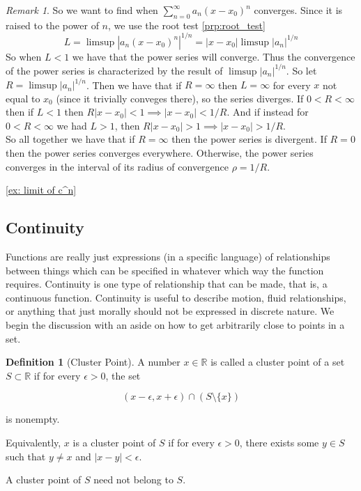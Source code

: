 \documentclass{article}
\theoremstyle{definition}
\newtheorem{definition}{Definition}[section]
\theoremstyle{remark}
\newtheorem{remark}{Remark}[section]
\begin{document}
\begin{remark}
So we want to find when $\sum_{n=0}^{\infty} a_n (x - x_0)^n$ converges. 
Since it is raised to the power of $n$, we use the root test \ref{prp:root_test}
\[
L = \limsup |a_n (x - x_0)^n|^{1/n} = |x-x_0|\limsup{|a_n|^{1/n}} 
\]
So when $L < 1$ we have that the power series will converge. Thus the convergence of 
the power series is characterized by the result of $\limsup{|a_n|^{1/n}}$. So let $R = \limsup{|a_n|^{1/n}}$.
Then we have that if $R = \infty$ then $L = \infty$ for every $x$ not equal to $x_0$ (since it trivially 
conveges there), so the series diverges. If $0 < R < \infty$ then if $L < 1$ then $R|x-x_0| < 1 \implies |x-x_0| < 1/R$.
And if instead for $0 < R < \infty$ we had $L>1$, then $R|x-x_0| > 1 \implies |x-x_0| > 1/R$.\\
So all together we have that if $R = \infty$ then the power series is divergent. If 
$R = 0$ then the power series converges everywhere. Otherwise, the power series converges in the interval 
of its radius of convergence $\rho = 1/R$.



\end{remark}


\ref{ex: limit of c^n}








\subsection{Continuity}
Functions are really just expressions (in a specific language) of relationships
between things which can be specified in whatever which way the function requires. 
Continuity is one type of relationship that can be made, that is, a continuous function. 
Continuity is useful to describe motion, fluid relationships, or anything that just 
morally should not be expressed in discrete nature. We begin the discussion with an aside on 
how to get arbitrarily close to points in a set.



\begin{definition}[Cluster Point]\label{def:cluster_point}
A number \( x \in \mathbb{R} \) is called a cluster point of a set \( S \subset \mathbb{R} \) if for every \( \epsilon > 0 \), the set  

\[
(x - \epsilon, x + \epsilon) \cap (S \setminus \{x\})
\]

is nonempty.  

Equivalently, \( x \) is a cluster point of \( S \) if for every \( \epsilon > 0 \), there exists some \( y \in S \) such that \( y \neq x \) and \( |x - y| < \epsilon \).  

A cluster point of \( S \) need not belong to \( S \).
\end{definition}
\end{document}
